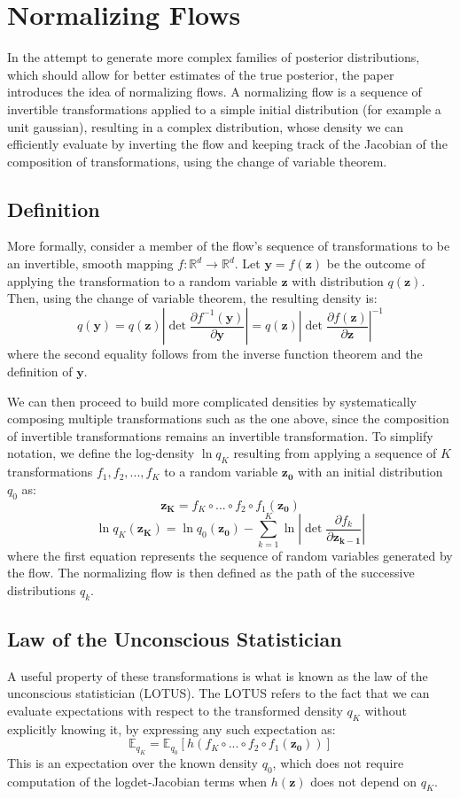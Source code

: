\chapter{Normalizing Flows}
In the attempt to generate more complex families of posterior distributions, which should allow for better estimates of the true posterior, the paper introduces the idea of normalizing flows. A normalizing flow is a sequence of invertible transformations applied to a simple initial distribution (for example a unit gaussian), resulting in a complex distribution, whose density we can efficiently evaluate by inverting the flow and keeping track of the Jacobian of the composition of transformations, using the change of variable theorem.

\section{Definition}

More formally, consider a member of the flow's sequence of transformations to be an invertible, smooth mapping $f:\mathbb{R}^d \rightarrow \mathbb{R}^d$. Let $\mathbf{y}=f(\mathbf{z})$ be the outcome of applying the transformation to a random variable $\mathbf{z}$ with distribution $q(\mathbf{z})$. Then, using the change of variable theorem, the resulting density is:
\[ q(\mathbf{y}) = q(\mathbf{z}) \left| \det \frac{\partial f^{-1}(\mathbf{y})}{\partial \mathbf{y}}  \right| = q(\mathbf{z}) \left| \det \frac{\partial f(\mathbf{z})}{\partial \mathbf{z}} \right| ^ {-1} \]
where the second equality follows from the inverse function theorem and the definition of $\mathbf{y}$.

We can then proceed to build more complicated densities by systematically composing multiple transformations such as the one above, since the composition of invertible transformations remains an invertible transformation. To simplify notation, we define the log-density $\ln q_K$ resulting from applying a sequence of $K$ transformations $f_1,f_2,...,f_K$ to a random variable $\mathbf{z_0}$ with an initial distribution $q_0$ as:
\[ \mathbf{z_K} = f_K \circ ... \circ f_2 \circ f_1(\mathbf{z_0}) \]
\[ \ln q_K(\mathbf{z_K}) = \ln q_0(\mathbf{z_0}) - \sum_{k=1}^{K} \ln \left| \det \frac{\partial f_k}{\partial \mathbf{z_{k-1}}} \right|  \]
where the first equation represents the sequence of random variables generated by the flow.  The normalizing flow is then defined as the path of the successive distributions $q_k$. 

\section{Law of the Unconscious Statistician}
A useful property of these transformations is what is known as the law of the unconscious statistician (LOTUS). The LOTUS refers to the fact that we can evaluate expectations with respect to the transformed density $q_K$ without explicitly knowing it, by expressing any such expectation as:
\[ \mathbb{E}_{q_K} = \mathbb{E}_{q_0}[h(f_K \circ ... \circ f_2 \circ f_1(\mathbf{z_0}))] \]
This is an expectation over the known density $q_0$, which does not require computation of the logdet-Jacobian terms when $h(\mathbf{z})$ does not depend on $q_K$.

